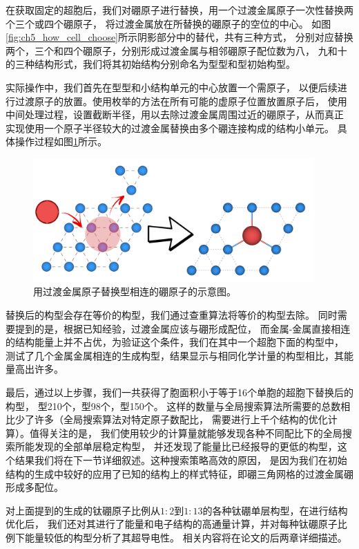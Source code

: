 在获取固定的超胞后，我们对硼原子进行替换，用一个过渡金属原子一次性替换两个三个或四个硼原子，
将过渡金属放在所替换的硼原子的空位的中心。
如图\ref{fig:ch5_how_cell_choose}所示阴影部分中的替代，共有三种方式，
分别对应替换两个，三个和四个硼原子，分别形成过渡金属与相邻硼原子配位数为八，
九和十的三种结构形式，我们将其初始结构分别命名为型型和型初始构型。

实际操作中，我们首先在型型和小结构单元的中心放置一个需原子，
以便后续进行过渡原子的放置。使用枚举的方法在所有可能的虚原子位置放置原子后，
使用中间处理过程，设置截断半径，用以去除过渡金属周围过近的硼原子，从而真正
实现使用一个原子半径较大的过渡金属替换由多个硼连接构成的结构小单元。
具体操作过程如图\ref{fig:btm3}所示。

\begin{figure}
  \includegraphics[width=0.96\textwidth]{figs/btm3.png}
  \centering
  \caption{用过渡金属原子替换型相连的硼原子的示意图。}
  \label{fig:btm3}
\end{figure}


替换后的构型会存在等价的构型，我们通过查重算法将等价的构型去除。
同时需要提到的是，根据已知经验，过渡金属应该与硼形成配位，
而金属-金属直接相连的结构能量上并不占优，为验证这个条件，我们在其中一个超胞下面的构型中，
测试了几个金属金属相连的生成构型，结果显示与相同化学计量的构型相比，其能量高出许多。

最后，通过以上步骤，我们一共获得了胞面积小于等于16个单胞的超胞下替换后的构型，
型\num{210}个，型\num{98}个，型\num{150}个。
这样的数量与全局搜索算法所需要的总数相比少了许多（全局搜索算法对特定原子数配比，
需要进行上千个结构的优化计算）。值得关注的是，
我们使用较少的计算量就能够发现各种不同配比下的全局搜索所能发现的全部单层稳定构型，
并还发现了能量比已经报导的更低的构型，这个结果我们将在下一节详细叙述。这种搜索策略高效的原因，
是因为我们在初始结构的生成中较好的应用了已知的结构上的样式特征，即硼三角网格的过渡金属硼形成多配位。

对上面提到的生成的钛硼原子比例从$1:2$到$1:13$的各种钛硼单层构型，在进行结构优化后，
我们还对其进行了能量和电子结构的高通量计算，并对每种钛硼原子比例下能量较低的构型分析了其超导电性。
相关内容将在论文的后两章详细描述。


